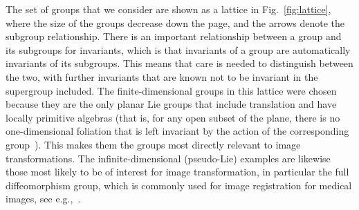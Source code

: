 \documentclass{artjlt}
\begin{document}
The set of groups that we consider are shown as a lattice in Fig.~\ref{fig:lattice}, where the size of the groups decrease down the page, and the arrows denote the subgroup relationship.  There is an important relationship between a group and its subgroups for invariants, which is that invariants of a group are automatically invariants of its subgroups. This means that care is needed to distinguish between the two, with further invariants that are known not to be invariant in the supergroup included. The finite-dimensional groups in this lattice were chosen because they are the only planar Lie groups that include translation and have locally primitive algebras (that is, for any open subset of the plane, there is no one-dimensional foliation that is left invariant by the action of the corresponding group~\citep{Gonzalez-Lopez90}). This makes them the groups most directly relevant to image transformations. The infinite-dimensional (pseudo-Lie) examples are likewise those most likely to be of interest for image transformation, in particular the full diffeomorphism group, which is commonly used for image registration for medical images, see e.g.,~\citet{YounesBook}.

\end{document}
